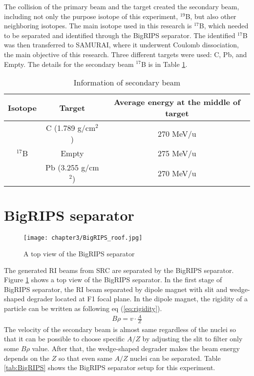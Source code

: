 The collision of the primary beam and the target created the secondary beam, including not only the purpose isotope of this experiment, ${}^{19}$B, but also other neighboring isotopes. The main isotope used in this research is ${}^{17}$B, which needed to be separated and identified through the BigRIPS separator. The identified ${}^{17}$B was then transferred to SAMURAI, where it underwent Coulomb dissociation, the main objective of this research. Three different targets were used: C, Pb, and Empty. The details for the secondary beam $^{17}$B is in Table \ref{tab:Secondary_Beam}.
\begin{table}[ht]
    \centering
    \begin{tabular}[ht]{c|c|c}
        \hline
        Isotope & Target & Average energy at the middle of target \\
        \hline
        & C (1.789 g/cm$^2$)  & 270 MeV/u\\
        ${}^{17}$B & Empty  & 275 MeV/u\\
        & Pb (3.255 g/cm$^2$) & 270 MeV/u\\
        \hline    
    \end{tabular}
    \caption{Information of secondary beam}
    \label{tab:Secondary_Beam}
\end{table}

\section{BigRIPS separator}

\begin{figure}[]
    \centering
    \texttt{[image: chapter3/BigRIPS\_roof.jpg]}
    \caption{A top view of the BigRIPS separator \cite{Dayonewiki}}
    \label{fig:BigRIPS}
\end{figure} 

The generated RI beams from SRC are separated by the BigRIPS separator. Figure \ref{fig:BigRIPS} shows a top view of the BigRIPS separator. In the first stage of BigRIPS separator, the RI beam separated by dipole magnet with slit and wedge-shaped degrader located at F1 focal plane. In the dipole magnet, the rigidity of a particle can be written as following eq (\ref{eq:rigidity}).
    \begin{align}
        B\rho = v \cdot \frac{A}{Z}  \label{eq:rigidity}
    \end{align}
The velocity of the secondary beam is almost same regardless of the nuclei so that it can be possible to choose specific $A/Z$ by adjusting the slit to filter only some $B\rho$ value. After that, the wedge-shaped degrader makes the beam energy depends on the $Z$ so that even same $A/Z$ nuclei can be separated. Table \ref{tab:BigRIPS} shows the BigRIPS separator setup for this experiment.

